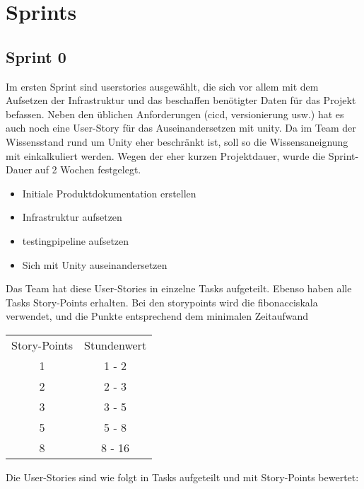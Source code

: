\documentclass[../main.tex]{subfiles}
\begin{document}
	\section{Sprints}
	\label{section:Sprint 0}
	\subsection{Sprint 0}
	
	\par Im ersten Sprint sind \gls{userstories} ausgewählt, die sich vor allem mit dem Aufsetzen der Infrastruktur und das beschaffen benötigter Daten für das Projekt befassen. Neben den üblichen Anforderungen (\gls{cicd}, \gls{versionierung} usw.) hat es auch noch eine User-Story für das Auseinandersetzen mit \gls{unity}. Da im Team der Wissensstand rund um Unity eher beschränkt ist, soll so die Wissensaneignung mit einkalkuliert werden. Wegen der eher kurzen Projektdauer, wurde die Sprint-Dauer auf 2 Wochen festgelegt.
	
	\begin{itemize}
		\item Initiale Produktdokumentation erstellen
		\item Infrastruktur aufsetzen
		\item \gls{testingpipeline} aufsetzen
		\item Sich mit Unity auseinandersetzen
	\end{itemize} 

	\par Das Team hat diese User-Stories in einzelne Tasks aufgeteilt. Ebenso haben alle Tasks Story-Points erhalten. Bei den \gls{storypoints} wird die \gls{fibonacciskala} verwendet, und die Punkte entsprechend dem minimalen Zeitaufwand
	
	\begin{center}
		 \begin{tabular}{c | c} 
			\hline
			Story-Points & Stundenwert \\ [0.5ex] 
			1 & 1 - 2 \\ [1ex] 
			2 & 2 - 3 \\ [1ex]
			3 & 3 - 5 \\ [1ex]
			5 & 5 - 8 \\ [1ex]
			8 & 8 - 16\\ [1ex] 
			\hline
		\end{tabular}
	\end{center}

	\par Die User-Stories sind wie folgt in Tasks aufgeteilt und mit Story-Points bewertet:
	
\end{document}
